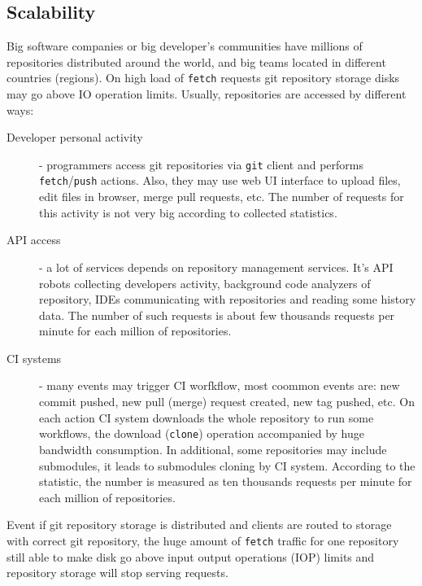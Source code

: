 \documentclass[12pt,oneside]{article}
\newcommand{\code}[1]{\texttt{#1}}
\begin{document}
\subsection{Scalability}

Big software companies or big developer's communities have
millions of repositories distributed around the world, and big teams located in different countries
(regions). On high load of \code{fetch} requests git repository storage disks may go above IO operation limits.
Usually, repositories are accessed by different ways:
\begin{description}
  \item[Developer personal activity] - programmers access git repositories via
    \code{git} client and performs \code{fetch}/\code{push} actions. Also, they
    may use web UI interface to upload files, edit files in browser, merge pull requests, etc.
    The number of requests for this activity is not very big according to collected statistics.
  \item[API access] - a lot of services depends on repository management services. It's API robots
    collecting developers activity, background code analyzers of repository, IDEs communicating
    with repositories and reading some history data. The number of such requests is about
    few thousands requests per minute for each million of repositories.
  \item[CI systems] - many events may trigger CI worfkflow, most coommon events are:
    new commit pushed, new pull (merge) request created, new tag pushed, etc.
    On each action CI system downloads the whole repository to run some workflows,
    the download (\code{clone}) operation accompanied by huge bandwidth consumption.
    In additional, some repositories may include submodules, it leads to submodules cloning by CI
    system. According to the statistic, the number is measured as ten thousands requests per minute
    for each million of repositories.
\end{description}

Event if git repository storage is distributed and clients are routed to storage with
correct git repository, the huge amount of \code{fetch} traffic for one repository still able to
make disk go above input output operations (IOP) limits and repository storage will stop
serving requests.
\end{document}
